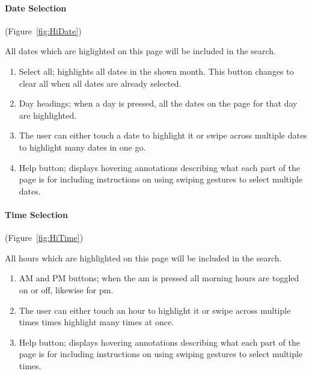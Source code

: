 \paragraph{Date Selection} (Figure~\ref{fig:HiDate})


All dates which are higlighted on this page will be included in the
search.
\begin{enumerate}
	\item Select all; highlights all dates in the shown month. This button
		changes to clear all when all dates are already selected.
	\item Day headings; when a day is pressed, all the dates on the page for
		that day are highlighted.
	\item The user can either touch a date to highlight it or swipe across multiple
		dates to highlight many dates in one go.
	\item Help button; displays hovering annotations describing what each part
		of the page is for including instructions on using swiping gestures
		to select multiple dates.
\end{enumerate}

\paragraph{Time Selection} (Figure~\ref{fig:HiTime})


All hours which are highlighted on this page will be included in the
search.
\begin{enumerate}
	\item AM and PM buttons; when the am is pressed all morning hours are toggled
		on or off, likewise for pm.
	\item The user can either touch an hour to highlight it or swipe across
		multiple times times highlight many times at once.
	\item Help button; displays hovering annotations describing what each part
		of the page is for including instructions on using swiping gestures
		to select multiple times.
\end{enumerate}

